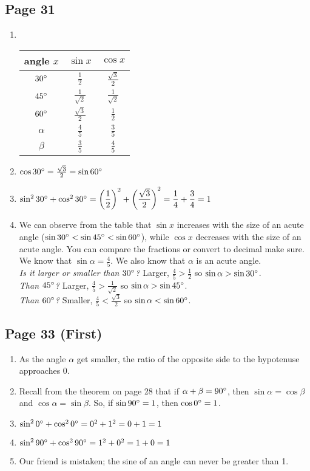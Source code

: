 \documentclass{article}
\newenvironment{solutions}[1]
{\subsection*{#1}
 \begin{enumerate}[leftmargin=1.5em]}
{\end{enumerate}}
\newcommand{\solution}{\item}
\begin{document}
\begin{solutions}{Page 31}
\solution ~ %
\begin{center}
\bgroup
\def\arraystretch{2}
\setlength\tabcolsep{15pt}
\begin{tabular}{ |c|c|c| }
\hline
angle $x$ & $\sin{x}$ & $\cos{x}$ \\
\hline
$30\degree$ & $\frac{1}{2}$        & $\frac{\sqrt{3}}{2}$ \\
$45\degree$ & $\frac{1}{\sqrt{2}}$ & $\frac{1}{\sqrt{2}}$ \\ 
$60\degree$ & $\frac{\sqrt{3}}{2}$ & $\frac{1}{2}$        \\
$\alpha$    & $\frac{4}{5}$        & $\frac{3}{5}$        \\
$\beta$     & $\frac{3}{5}$        & $\frac{4}{5}$        \\
\hline
\end{tabular}
\egroup
\end{center}

\solution %
$\cos{30\degree} = \frac{\sqrt{3}}{2} = \sin{60\degree}$

\solution %
$\sin^{2}{30\degree} + \cos^{2}{30\degree} = \left(\dfrac{1}{2}\right)^{2} + \left(\dfrac{\sqrt{3}}{2}\right)^{2} = \dfrac{1}{4} + \dfrac{3}{4} = 1$

\solution %
We can observe from the table that $\sin{x}$ increases with the size of an acute angle ($\sin{30\degree} < \sin{45\degree} < \sin{60\degree}$), while $\cos{x}$ decreases with the size of an acute angle. You can compare the fractions or convert to decimal make sure. We know that $\sin{\alpha} = \frac{4}{5}$. We also know that $\alpha$ is an acute angle.\\
\textit{Is it larger or smaller than $30\degree$?} Larger, $\frac{4}{5} > \frac{1}{2}$ so $\sin{\alpha} > \sin{30\degree}$.\\
\textit{Than $45\degree$?} Larger, $\frac{4}{5} > \frac{1}{\sqrt{2}}$ so $\sin{\alpha} > \sin{45\degree}$.\\
\textit{Than $60\degree$?} Smaller, $\frac{4}{5} < \frac{\sqrt{3}}{2}$ so $\sin{\alpha} < \sin{60\degree}$.

\end{solutions}

\begin{solutions}{Page 33 (First)}
\solution %
As the angle $\alpha$ get smaller, the ratio of the opposite side to the hypotenuse approaches 0.

\solution %
Recall from the theorem on page 28 that if $\alpha + \beta = 90\degree$, then $\sin{\alpha} = \cos{\beta}$ and $\cos{\alpha} = \sin{\beta}$. So, if $\sin{90\degree} = 1$, then $\cos{0\degree} = 1$.

\solution %
$\sin^{2}{0\degree} + \cos^{2}{0\degree} = 0^2 + 1^2 = 0 + 1 = 1$

\solution %
$\sin^{2}{90\degree} + \cos^{2}{90\degree} = 1^2 + 0^2 = 1 + 0 = 1$

\solution %
Our friend is mistaken; the sine of an angle can never be greater than 1.
\end{solutions}
\end{document}
